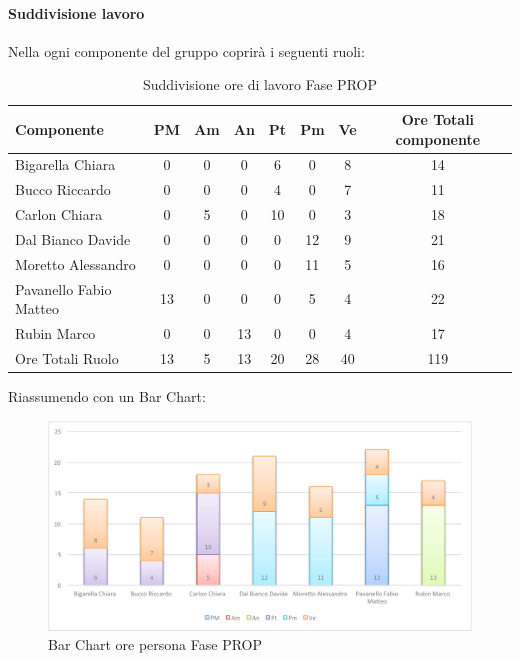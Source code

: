 			\paragraph{Suddivisione lavoro}
				Nella  ogni componente del gruppo \groupname{} coprirà i seguenti ruoli:
				\begin{table}[H]
					\begin{center}
						\begin{tabular}{| l | c | c | c | c | c | c | c |}
							\hline
							Componente 				& PM	& Am 	& An 	& Pt 		& Pm 	& Ve 	& Ore Totali componente \\ \hline
							
							Bigarella Chiara 			& 0		& 0		& 0		& 6 		& 0		& 8 		& 14 \\
							Bucco Riccardo 			& 0		& 0		& 0		& 4 		& 0		& 7 		& 11 \\
							Carlon Chiara	 			& 0		& 5 		& 0		& 10 		& 0		& 3 		& 18 \\
							Dal Bianco Davide 			& 0		& 0		& 0		& 0		& 12 		& 9 		& 21 \\
							Moretto Alessandro 			& 0		& 0		& 0		& 0		& 11 		& 5		& 16 \\
							Pavanello Fabio Matteo	 	& 13 		& 0		& 0		& 0		& 5 		& 4 		& 22 \\
							Rubin Marco				& 0		& 0		& 13 		& 0		& 0		& 4 		& 17 \\ \hline \hline
							
							Ore Totali Ruolo 			& 13 		& 5 		& 13 		& 20 		& 28 		& 40 		& 119\\ \hline
						\end{tabular}
					\end{center}
					\caption{Suddivisione ore di lavoro Fase PROP}
				\end{table}
				Riassumendo con un Bar Chart:
				\begin{figure}[H]\centering
					\includegraphics[width=\textwidth]{PianoDiProgetto/Pics/ChartOreFasePROP.pdf}
					\caption{Bar Chart ore persona Fase PROP}
				\end{figure}
